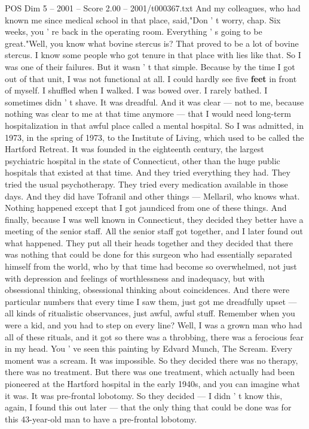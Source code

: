 \begin{textsample}{POS Dim 5 – 2001 – Score 2.00 – 2001/t000367.txt}
And my colleagues, who had known me since medical school in that place, said,"Don ' t worry, chap.
Six weeks, you ' re back in the operating room.
Everything ' s going to be great."Well, you know what bovine stercus is?
That proved to be a lot of bovine stercus.
I know some people who got tenure in that place with lies like that.
So I was one of their failures.
But it wasn ' t that simple.
Because by the time I got out of that unit, I was not functional at all.
I could hardly see five \textbf{feet} in front of myself.
I shuffled when I walked.
I was bowed over.
I rarely bathed.
I sometimes didn ' t shave.
It was dreadful.
And it was clear — not to me, because nothing was clear to me at that time anymore — that I would need long-term hospitalization in that awful place called a mental hospital.
So I was admitted, in 1973, in the spring of 1973, to the Institute of Living, which used to be called the Hartford Retreat.
It was founded in the eighteenth century, the largest psychiatric hospital in the state of Connecticut, other than the huge public hospitals that existed at that time.
And they tried everything they had.
They tried the usual psychotherapy.
They tried every medication available in those days.
And they did have Tofranil and other things — Mellaril, who knows what.
Nothing happened except that I got jaundiced from one of these things.
And finally, because I was well known in Connecticut, they decided they better have a meeting of the senior staff.
All the senior staff got together, and I later found out what happened.
They put all their heads together and they decided that there was nothing that could be done for this surgeon who had essentially separated himself from the world, who by that time had become so overwhelmed, not just with depression and feelings of worthlessness and inadequacy, but with obsessional thinking, obsessional thinking about coincidences.
And there were particular numbers that every time I saw them, just got me dreadfully upset — all kinds of ritualistic observances, just awful, awful stuff.
Remember when you were a kid, and you had to step on every line?
Well, I was a grown man who had all of these rituals, and it got so there was a throbbing, there was a ferocious fear in my head.
You ' ve seen this painting by Edvard Munch, The Scream.
Every moment was a scream.
It was impossible.
So they decided there was no therapy, there was no treatment.
But there was one treatment, which actually had been pioneered at the Hartford hospital in the early 1940s, and you can imagine what it was.
It was pre-frontal lobotomy.
So they decided — I didn ' t know this, again, I found this out later — that the only thing that could be done was for this 43-year-old man to have a pre-frontal lobotomy.

\end{textsample}
